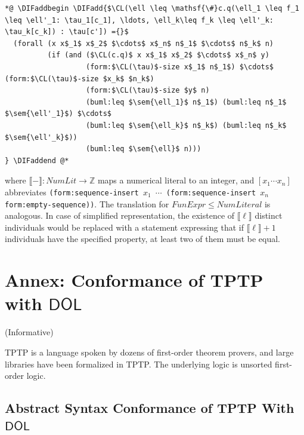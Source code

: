\documentclass[10pt,fleqn,final]{scrreprt}
\newcommand*{\CL}{\ensuremath{\mathsf{CL}}\xspace}
\newcommand*{\DOL}{\ensuremath{\mathsf{DOL}}\xspace}
\newcommand{\informative}[0]{{\begin{center}{\Large{(Informative})}\end{center}} \bigskip}
\newcommand{\infannex}[1]{ \chapter{Annex: #1}  \informative }
\newcommand{\ZZ}{\mathbb{Z}}
\newcommand{\sem}[1]{\mathopen\llbracket#1\mathclose\rrbracket}
\providecommand{\DIFadd}[1]{{\protect\color{blue}\uwave{#1}}} %
\providecommand{\DIFaddbegin}{} %
\providecommand{\DIFaddend}{} %
\begin{document}
\begin{lstlisting}[language=clif, mathescape]
*@ \DIFaddbegin \DIFadd{$\CL(\ell \leq \mathsf{\#}c.q(\ell_1 \leq f_1 \leq \ell'_1: \tau_1[c_1], \ldots, \ell_k\leq f_k \leq \ell'_k: \tau_k[c_k]) : \tau[c']) ={}$
  (forall (x x$_1$ x$_2$ $\cdots$ x$_n$ n$_1$ $\cdots$ n$_k$ n)
          (if (and ($\CL(c.q)$ x x$_1$ x$_2$ $\cdots$ x$_n$ y)
                   (form:$\CL(\tau)$-size x$_1$ n$_1$) $\cdots$ (form:$\CL(\tau)$-size $x_k$ $n_k$)
                   (form:$\CL(\tau)$-size $y$ n)
                   (buml:leq $\sem{\ell_1}$ n$_1$) (buml:leq n$_1$ $\sem{\ell'_1}$) $\cdots$
                   (buml:leq $\sem{\ell_k}$ n$_k$) (buml:leq n$_k$ $\sem{\ell'_k}$))
                   (buml:leq $\sem{\ell}$ n)))
} \DIFaddend @*
\end{lstlisting}
%
where $\sem{-} : \mathit{NumLit} \to \ZZ$
maps a numerical literal to an integer, and $[x_1\cdots x_n]$
abbreviates \texttt{(form:sequence-insert $x_1$
  $\cdots$
  (form:sequence-insert $x_n$
  form:empty-sequence)\DIFaddbegin \DIFadd{$\cdots$}\DIFaddend )}.
The translation for $\mathit{FunExpr} \leq \mathit{NumLiteral}$
is analogous. In case of simplified representation, the existence of
$\sem{\ell}$
distinct individuals would be replaced with a statement expressing that
if $\sem{\ell}+1$
individuals have the specified property, at least two of them must be
equal.





\infannex{Conformance of TPTP with \DOL}\label{a:TPTP}

TPTP \cite{TPTP,DBLP:conf/cade/SutcliffeSY94,DBLP:journals/jar/Sutcliffe09}
is a language spoken by dozens of first-order theorem provers,
and large libraries have been formalized in TPTP.
The underlying logic is unsorted first-order logic. 
\DIFaddbegin 

\section{Abstract Syntax Conformance of TPTP With \DOL}
\end{document}
